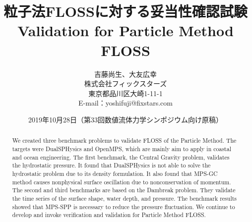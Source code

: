 \documentclass[twocolumn, a4j]{ltjsarticle}
\title{粒子法FLOSSに対する妥当性確認試験 \\ Validation for Particle Method FLOSS}
\author{吉藤尚生、大友広幸 \\
	株式会社フィックスターズ \\
	東京都品川区大崎1-11-1 \\
	E-mail：yoshifuji@fixstars.com}
\date{2019年10月28日（第33回数値流体力学シンポジウム向け原稿）}
\begin{document}
\maketitle

\begin{abstract}
We created three benchmark problems to validate FLOSS of the Particle Method.
The targets were DualSPHysics and OpenMPS, which are mainly aim to apply in coastal and ocean engineering.
The first benchmark, the Central Gravity problem, validates the hydrostatic pressure.
It found that DualSPHysics is not able to solve the hydrostatic problem due to its density formulation.
It also found that MPS-GC method causes nonphysical surface oscillation due to nonconservation of momentum.
The second and third benchmarks are based on the Dambreak problem.
They validate the time series of the surface shape, water depth, and pressure.
The benchmark results showed that MPS-SPP is necessary to reduce the pressure fluctuation.
We continue to develop and invoke verification and validation for Particle Method FLOSS.
\end{abstract}


\end{document}
